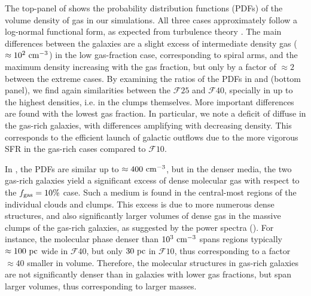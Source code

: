 \documentclass[useAMS,usenatbib]{mnras}
\newcommand{\fgas}{\ensuremath{f_{\rm gas}}\xspace}
\newcommand{\gs}{\ensuremath{\mathcal{F}10}\xspace}
\newcommand{\gm}{\ensuremath{\mathcal{F}25}\xspace}
\newcommand{\gl}{\ensuremath{\mathcal{F}40}\xspace}
\begin{document}
The top-panel of  shows the probability distribution functions (PDFs) of the volume density of gas in our simulations. All three cases approximately follow a log-normal functional form, as expected from turbulence theory \citep{Hennebelle2012}. The main differences between the galaxies are a slight excess of intermediate density gas ($\approx 10^2 \mathrm{~cm^{-3}}$) in the low gas-fraction case, corresponding to spiral arms, and the maximum density increasing with the gas fraction, but only by a factor of $\approx 2$ between the extreme cases. By examining the ratios of the PDFs in \hi and \htwo (bottom panel), we find again similarities between the \gm and \gl, specially in \htwo up to the highest densities, i.e. in the clumps themselves. More important differences are found with the lowest gas fraction. In particular, we note a deficit of diffuse \hi in the gas-rich galaxies, with differences amplifying with decreasing density. This corresponds to the efficient launch of galactic outflows due to the more vigorous SFR in the gas-rich cases compared to \gs.

In \htwo, the PDFs are similar up to $\approx 400 \mathrm{~cm^{-3}}$, but in the denser media, the two gas-rich galaxies yield a significant excess of dense molecular gas with respect to the $\fgas = 10\%$ case. Such a medium is found in the central-most regions of the individual clouds and clumps. This excess is due to more numerous dense structures, and also significantly larger volumes of dense gas in the massive clumps of the gas-rich galaxies, as suggested by the power spectra (). For instance, the molecular phase denser than $10^3 \mathrm{~cm^{-3}}$ spans regions typically $\approx 100 \mathrm{~pc}$ wide in \gl, but only $30 \mathrm{~pc}$ in \gs, thus corresponding to a factor $\approx 40$ smaller in volume. Therefore, the molecular structures in gas-rich galaxies are not significantly denser than in galaxies with lower gas fractions, but span larger volumes, thus corresponding to larger masses.
\end{document}
